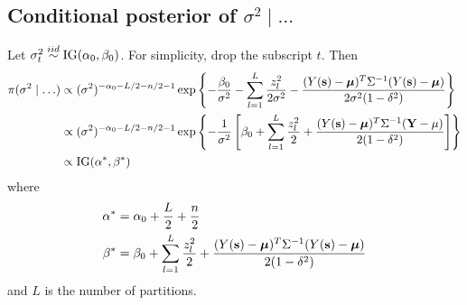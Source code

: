 \subsection*{Conditional posterior of $\sigma^2 \mid \ldots$}\label{s:sigpost}
Let $\sigma_t^2 \stackrel{iid}{\sim} \mbox{IG}(\alpha_0, \beta_0)$. For simplicity, drop the subscript $t$. Then
\begin{align*}
    \pi(\sigma^2 \mid \ldots) & \propto (\sigma^2)^{ -\alpha_0 - L / 2 - n / 2 - 1} \exp \left\{ -\frac{\beta_0}{\sigma^2} - \sum_{l=1}^L \frac{ z_l^2 }{2 \sigma^2} - \frac{ (Y(\mbox{\bf s}) - \mbox{\boldmath $\mu$})^T \Sigma^{-1} (Y(\mbox{\bf s}) - \mbox{\boldmath $\mu$}) }{2 \sigma^2 (1 - \delta^2)} \right\} \\
    & \propto (\sigma^2)^{ -\alpha_0 - L / 2 - n / 2 - 1} \exp \left\{ - \frac{ 1 }{ \sigma^2 } \left[\beta_0 + \sum_{ l = 1 }^{ L}\frac{ z_{l}^2 }{ 2 } + \frac{ (Y(\mbox{\bf s}) - \mbox{\boldmath $\mu$})^T \Sigma^{-1} (\mbox{\bf Y} - \mu) }{ 2 (1 - \delta^2)} \right] \right\} \\
    & \propto \mbox{IG} (\alpha^*, \beta^*)
\end{align*}
where
\begin{align*}
    \alpha^* &= \alpha_0 + \frac{L}{2} + \frac{n}{2} \\
    \beta^* &= \beta_0 + \sum_{ l = 1 }^{ L}\frac{ z_{l}^2 }{ 2 } + \frac{ (Y(\mbox{\bf s}) - \mbox{\boldmath $\mu$})^T \Sigma^{-1} (Y(\mbox{\bf s}) - \mbox{\boldmath $\mu$}) }{ 2 (1 - \delta^2)}
\end{align*}
and $L$ is the number of partitions.